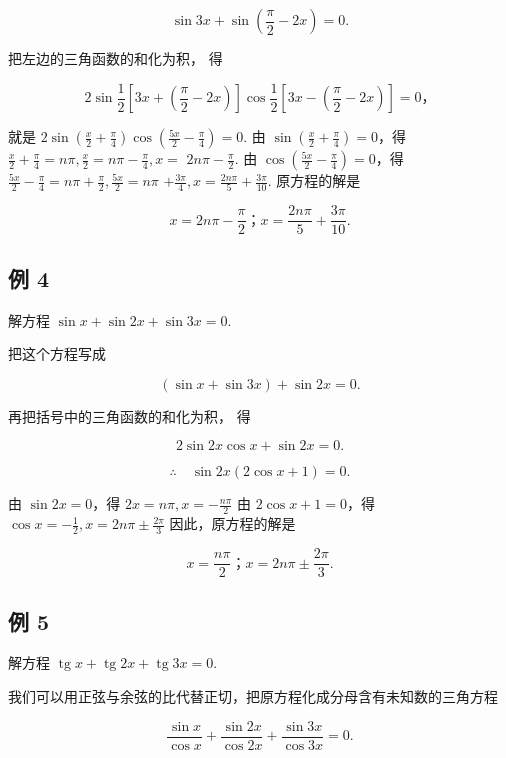 \[
\sin 3 x + \sin \left(\frac {\pi}{2} - 2 x\right) = 0.
\]

把左边的三角函数的和化为积， 得

\[
2 \sin \frac {1}{2} [ 3 x + (\frac {\pi}{2} - 2 x) ] \cos \frac {1}{2} [ 3 x - (\frac {\pi}{2} - 2 x) ] = 0\text{，}
\]

就是
\(2\sin \left(\frac{x}{2} +\frac{\pi}{4}\right)\cos \left(\frac{5x}{2} -\frac{\pi}{4}\right) = 0.\)
由 \(\sin \left(\frac{x}{2} +\frac{\pi}{4}\right) = 0\)，得
\(\frac{x}{2} +\frac{\pi}{4} = n\pi ,\frac{x}{2} = n\pi -\frac{\pi}{4},x =\)
\(2n\pi -\frac{\pi}{2}.\) 由
\(\cos \left(\frac{5x}{2} -\frac{\pi}{4}\right) = 0\)，得
\(\frac{5x}{2} -\frac{\pi}{4} = n\pi +\frac{\pi}{2},\frac{5x}{2} = n\pi\)
\(+\frac{3\pi}{4},x = \frac{2n\pi}{5} +\frac{3\pi}{10}.\) 原方程的解是

\[
x = 2 n \pi - \frac {\pi}{2}\text{；} x = \frac {2 n \pi}{5} + \frac {3 \pi}{10}.
\]

\subsection{例 4}

解方程 \(\sin x + \sin 2x + \sin 3x = 0.\)

 把这个方程写成

\[
(\sin x + \sin 3 x) + \sin 2 x = 0.
\]

再把括号中的三角函数的和化为积， 得

\[
2 \sin 2 x \cos x + \sin 2 x = 0.
\]

\[
\therefore \quad \sin2x(2\cos x+1)=0.
\]

由 \(\sin 2x = 0\)，得 \(2x = n\pi ,x = -\frac{n\pi}{2}\) 由
\(2\cos x + 1 = 0\)，得
\(\cos x = -\frac{1}{2}, x = 2n\pi \pm \frac{2\pi}{3}\)
因此，原方程的解是

\[
x = \frac {n \pi}{2}\text{；} x = 2 n \pi \pm \frac {2 \pi}{3}.
\]

\subsection{例 5}

解方程
\(\operatorname{tg} x + \operatorname{tg} 2x + \operatorname{tg} 3x = 0\).

我们可以用正弦与余弦的比代替正切，把原方程化成分母含有未知数的三角方程

\[
\frac {\sin x}{\cos x} + \frac {\sin 2 x}{\cos 2 x} + \frac {\sin 3 x}{\cos 3 x} = 0.
\]

